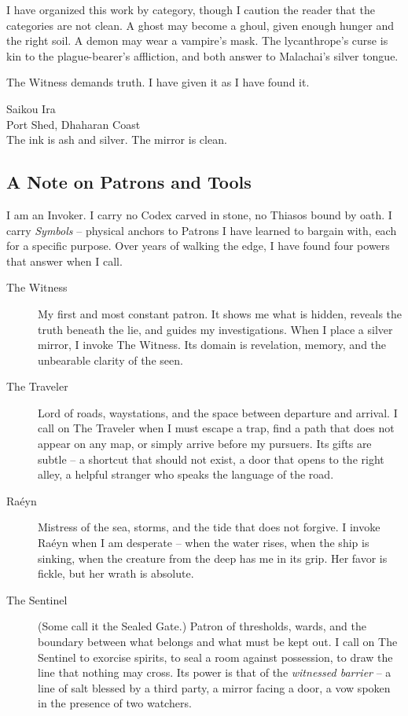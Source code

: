 \documentclass[10pt,twoside]{book}
\begin{document}
I have organized this work by category, though I caution the reader that the categories are not clean. A ghost may become a ghoul, given enough hunger and the right soil. A demon may wear a vampire's mask. The lycanthrope's curse is kin to the plague-bearer's affliction, and both answer to Malachai's silver tongue.

The Witness demands truth. I have given it as I have found it.

\begin{flushright}
Saikou Ira\\
Port Shed, Dhaharan Coast\\
The ink is ash and silver. The mirror is clean.
\end{flushright}

\vspace{0.5cm}
\subsection*{A Note on Patrons and Tools}
I am an Invoker. I carry no Codex carved in stone, no Thiasos bound by oath. I carry \emph{Symbols} -- physical anchors to Patrons I have learned to bargain with, each for a specific purpose. Over years of walking the edge, I have found four powers that answer when I call.

\begin{description}
\item[The Witness] My first and most constant patron. It shows me what is hidden, reveals the truth beneath the lie, and guides my investigations. When I place a silver mirror, I invoke The Witness. Its domain is revelation, memory, and the unbearable clarity of the seen.

\item[The Traveler] Lord of roads, waystations, and the space between departure and arrival. I call on The Traveler when I must escape a trap, find a path that does not appear on any map, or simply arrive before my pursuers. Its gifts are subtle -- a shortcut that should not exist, a door that opens to the right alley, a helpful stranger who speaks the language of the road.

\item[Raéyn] Mistress of the sea, storms, and the tide that does not forgive. I invoke Raéyn when I am desperate -- when the water rises, when the ship is sinking, when the creature from the deep has me in its grip. Her favor is fickle, but her wrath is absolute.

\item[The Sentinel] (Some call it the Sealed Gate.) Patron of thresholds, wards, and the boundary between what belongs and what must be kept out. I call on The Sentinel to exorcise spirits, to seal a room against possession, to draw the line that nothing may cross. Its power is that of the \emph{witnessed barrier} -- a line of salt blessed by a third party, a mirror facing a door, a vow spoken in the presence of two watchers.
\end{description}
\end{document}
